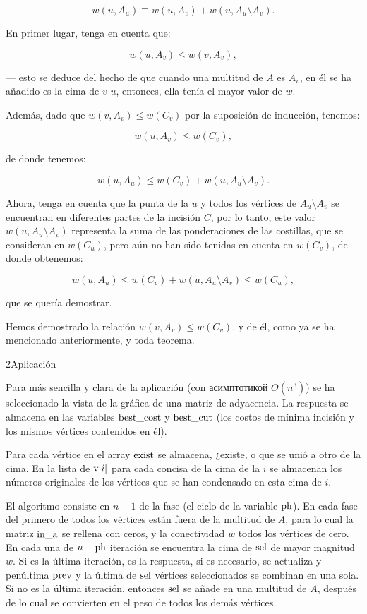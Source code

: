 $$ w(u,A_u) \equiv w(u,A_v) + w(u,A_u \setminus A_v). $$

En primer lugar, tenga en cuenta que:

$$ w(u,A_v) \le w(v,A_v), $$

--- esto se deduce del hecho de que cuando una multitud de $A$ es $A_v$, en él se ha añadido es la cima de $v$ $u$, entonces, ella tenía el mayor valor de $w$.

Además, dado que $w(v,A_v) \le w(C_v)$ por la suposición de inducción, tenemos:

$$ w(u,A_v) \le w(C_v), $$

de donde tenemos:

$$ w(u,A_u) \le w(C_v) + w(u,A_u \setminus A_v). $$

Ahora, tenga en cuenta que la punta de la $u$ y todos los vértices de $A_u \setminus A_v$ se encuentran en diferentes partes de la incisión $C$, por lo tanto, este valor $w(u,A_u \setminus A_v)$ representa la suma de las ponderaciones de las costillas, que se consideran en $w(C_u)$, pero aún no han sido tenidas en cuenta en $w(C_v)$, de donde obtenemos:

$$ w(u,A_u) \le w(C_v) + w(u,A_u \setminus A_v) \le w(C_u), $$

que se quería demostrar.

Hemos demostrado la relación $w(v,A_v) \le w(C_v)$, y de él, como ya se ha mencionado anteriormente, y toda teorema.


\h2{Aplicación}

Para más sencilla y clara de la aplicación (con асимптотикой $O(n^3)$) se ha seleccionado la vista de la gráfica de una matriz de adyacencia. La respuesta se almacena en las variables $\rm best\_cost$ y $\rm best\_cut$ (los costos de mínima incisión y los mismos vértices contenidos en él).

Para cada vértice en el array $\rm exist$ se almacena, ¿existe, o que se unió a otro de la cima. En la lista de ${\rm v}[i]$ para cada concisa de la cima de la $i$ se almacenan los números originales de los vértices que se han condensado en esta cima de $i$.

El algoritmo consiste en $n-1$ de la fase (el ciclo de la variable $\rm ph$). En cada fase del primero de todos los vértices están fuera de la multitud de $A$, para lo cual la matriz $\rm in\_a$ se rellena con ceros, y la conectividad $w$ todos los vértices de cero. En cada una de $n-{\rm ph}$ iteración se encuentra la cima de $\rm sel$ de mayor magnitud $w$. Si es la última iteración, es la respuesta, si es necesario, se actualiza y penúltima $\rm prev$ y la última de $\rm sel$ vértices seleccionados se combinan en una sola. Si no es la última iteración, entonces $\rm sel$ se añade en una multitud de $A$, después de lo cual se convierten en el peso de todos los demás vértices.

